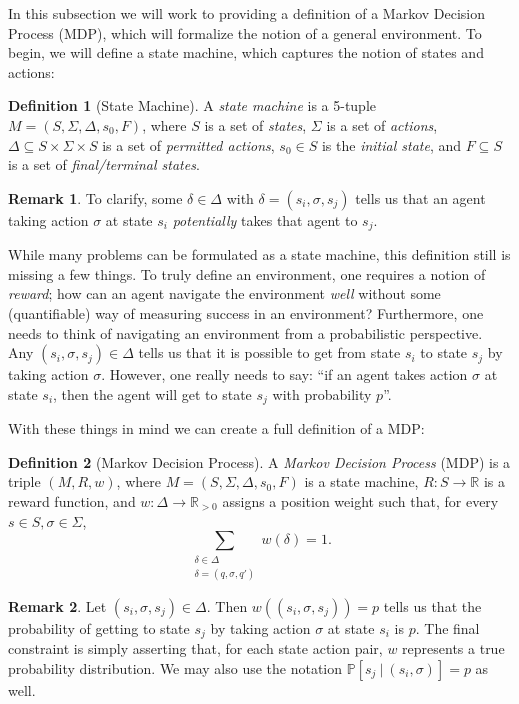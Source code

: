 \documentclass[12pt,oneside,oldfontcommands]{memoir}
\newcommand{\R}{\mathbb{R}}
\theoremstyle{definition}
\newtheorem{defn}{Definition}
\newtheorem{remark}{Remark}
\renewcommand{\d}{\delta}
\newcommand{\s}{\sigma}
\begin{document}
\begin{Subsection}
In this subsection we will work to providing a definition of a Markov Decision Process (MDP), which will formalize the notion of a general environment.
\tcblower
To begin, we will define a state machine, which captures the notion of states and actions:
\begin{defn}[State Machine]
A \textit{state machine} is a 5-tuple $M = (S, \Sigma, \Delta, s_0, F)$, where $S$ is a set of \textit{states}, $\Sigma$ is a set of \textit{actions}, $\Delta \subseteq S \times \Sigma \times S$ is a set of \textit{permitted actions}, $s_0 \in S$ is the \textit{initial state}, and $F \subseteq S$ is a set of \textit{final/terminal states}. 
\end{defn}

\begin{remark}
To clarify, some $\d \in \Delta$ with $\d = (s_i, \s, s_j)$ tells us that an agent taking action $\s$ at state $s_i$ \textit{potentially} takes that agent to $s_j$. 
\end{remark}

While many problems can be formulated as a state machine, this definition still is missing a few things. To truly define an environment, one requires a notion of \textit{reward}; how can an agent navigate the environment \textit{well} without some (quantifiable) way of measuring success in an environment? Furthermore, one needs to think of navigating an environment from a probabilistic perspective. Any $(s_i, \s, s_j) \in \Delta$ tells us that it is possible to get from state $s_i$ to state $s_j$ by taking action $\s$. However, one really needs to say: ``if an agent takes action $\s$ at state $s_i$, then the agent will get to state $s_j$ with probability $p$''. 

With these things in mind we can create a full definition of a MDP:
\begin{defn}[Markov Decision Process]
A \textit{Markov Decision Process} (MDP) is a triple $(M, R, w)$, where $M = (S, \Sigma, \Delta, s_0, F)$ is a state machine, $R: S \to \R$ is a reward function, and $w: \Delta \to \R_{>0}$ assigns a position weight such that, for every $s \in S, \s \in \Sigma$,
$$
\sum_{\substack{\d \in \Delta \\ \d = (q,\s,q')}} w(\d) = 1.
$$
\end{defn}

\begin{remark}
Let $(s_i, \s, s_j) \in \Delta$. Then $w((s_i,\s,s_j)) = p$ tells us that the probability of getting to state $s_j$ by taking action $\s$ at state $s_i$ is $p$. The final constraint is simply asserting that, for each state action pair, $w$ represents a true probability distribution. We may also use the notation $\mathbb{P}[s_j \ |\ (s_i, \s)] = p$ as well. 
\end{remark}
\end{Subsection}
\end{document}
